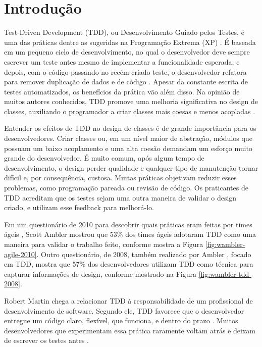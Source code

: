 \chapter{Introdução}
\label{cap:introducao}

Test-Driven Development (TDD), ou Desenvolvimento Guiado pelos Testes,
é uma das práticas dentre as sugeridas na Programação
Extrema (XP) \cite{XPExplained}. É baseada em um pequeno ciclo de
desenvolvimento, no qual o desenvolvedor deve sempre escrever um teste antes
mesmo de implementar a funcionalidade esperada, e depois, com o código
passando no recém-criado teste, o desenvolvedor refatora para 
remover duplicação de dados e de código \cite{TDDByExample}.
Apesar da constante escrita de testes automatizados, os benefícios da
prática vão além disso. Na opinião de muitos autores conhecidos, TDD promove
uma melhoria significativa no design de classes, auxiliando o programador a
criar classes mais coesas e menos acopladas \cite{TDDByExample} \cite{GOOS} 
\cite{astels-tdd}.

Entender os efeitos de TDD no design de classes é de grande importância para os
desenvolvedores.
Criar classes ou, em um nível maior de abstração, módulos que possuam um baixo
acoplamento e uma alta coesão demandam um esforço muito grande do desenvolvedor. 
É muito comum, após algum tempo de desenvolvimento, o design perder qualidade
e qualquer tipo de manutenção tornar difícil e, por consequência, custosa.
Muitas práticas objetivam reduzir esses problemas, como programação pareada ou
revisão de código. Os praticantes de TDD acreditam que os testes sejam uma outra
maneira de validar o design criado, e utilizam esse feedback para melhorá-lo.

Em um questionário de 2010 para descobrir quais práticas eram feitas por times
ágeis \cite{wambler-survey-agile}, Scott Ambler mostrou que 53\% dos times ágeis
adotaram TDD como uma maneira para validar o trabalho feito, conforme mostra a 
Figura \ref{fig:wambler-agile-2010}. Outro questionário, de 2008, também realizado por Ambler
\cite{wambler-survey-tdd}, focado em TDD, mostra que 57\% dos desenvolvedores 
utilizam TDD como técnica para capturar informações de design, conforme mostrado
na Figura \ref{fig:wambler-tdd-2008}.

Robert Martin chega a relacionar TDD à responsabilidade de um profissional de desenvolvimento
de software. 
Segundo ele, TDD favorece que o desenvolvedor entregue um 
código claro, flexível, que funciona, e dentro do prazo \cite{martin-profissionalismo}.
Muitos desenvolvedores que experimentam essa prática raramente voltam atrás e deixam
de escrever os testes antes \cite{tdd-fearless}. 

